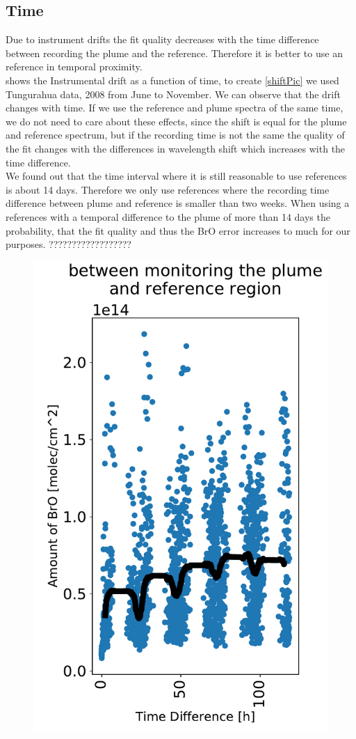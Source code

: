 \documentclass  [
  paper    = a4,
  BCOR     = 10mm,
  twoside,
  fontsize = 12pt,
  fleqn,
  toc      = bibnumbered,
  toc      = listofnumbered,
  numbers  = noendperiod,
  headings = normal,
  listof   = leveldown,
  version  = 3.03
]                                       {scrreprt}
\begin{document}
	\subsection{Time}
	Due to instrument drifts the fit quality decreases with the time difference between recording the plume and the reference. Therefore it is better to use an reference in temporal proximity.\\
	 shows the Instrumental drift as a function of time, to create \cref{shiftPic} we used Tungurahua data, 2008 from June to November. We can observe that the drift changes with time. If we use the reference and plume spectra of the same time, we do not need to care about these effects, since the shift is equal for the plume and reference spectrum, but if the recording time is not the same the quality of the fit changes with the differences in wavelength shift which increases with the time difference.\\
	We found out that the time interval where it is still reasonable to use references is about 14 days. Therefore we only use references where the recording time difference between plume and reference is smaller than two weeks. When using a references with a temporal difference to the plume of more than 14 days the probability, that the fit quality and thus the BrO error increases to much for our purposes. ??????????????????
	\begin{figure}
		\centering
		\includegraphics[width=0.7\linewidth]{Bilder/Datum_100h}
		\caption{}
		\label{fig:datum100h}
	\end{figure}
	
\end{document}
